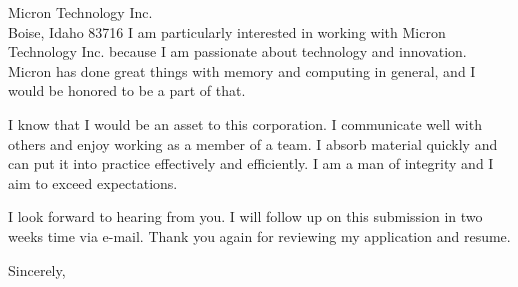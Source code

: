 \documentclass{letter} %
\begin{document}
\begin{large}
\begin{letter}{Micron Technology Inc.\\
Boise, Idaho 83716}
\noindent I am particularly interested in working with Micron Technology Inc. because I am passionate about technology and innovation. Micron has done great things with memory and computing in general, and I would be honored to be a part of that.


\noindent I know that I would be an asset to this corporation. I communicate well with others and enjoy working as a member of a team. I absorb material quickly and can put it into practice effectively and efficiently. I am a man of integrity and I aim to exceed expectations.

\noindent I look forward to hearing from you.  I will follow up on this submission in two weeks time via e-mail.  Thank you again for reviewing my application and resume. 




 
\closing{Sincerely,} 
 

 

\end{letter}
 \end{large}
\end{document}
